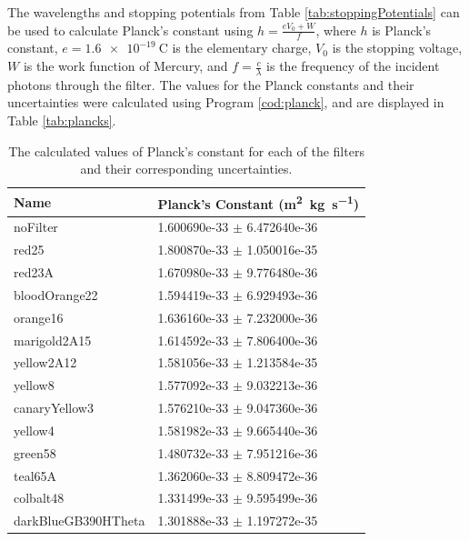 \documentclass[a4paper]{article}
\begin{document}
\qq The wavelengths and stopping potentials from Table
\ref{tab:stoppingPotentials} can be used to calculate Planck's constant using 
\( h = \frac{e V_0 + W}{f} \), where \( h \) is Planck's constant, \( e =
\SI{1.6e-19}{\coulomb} \) is the elementary charge, \( V_0 \) is the stopping
voltage, \( W \) is the work function of Mercury, and \( f = \frac{c}{\lambda}
\) is the frequency of the incident photons through the filter. The values for
the Planck constants and their uncertainties were calculated using Program
\ref{cod:planck}, and are displayed in Table \ref{tab:plancks}.

\begin{table}[H]
  \caption{The calculated values of Planck's constant for each of the filters
    and their corresponding uncertainties.}
  \begin{center}
    \begin{tabular}{|l|l|}
      \hline
      Name &                   Planck's Constant
             (\si{\square\meter\kilo\gram\per\second}) \\
      \hline
      noFilter &               1.600690e-33 \( \pm \) 6.472640e-36 \\
      red25 &                  1.800870e-33 \( \pm \) 1.050016e-35 \\
      red23A &                 1.670980e-33 \( \pm \) 9.776480e-36 \\
      bloodOrange22 &          1.594419e-33 \( \pm \) 6.929493e-36 \\
      orange16 &               1.636160e-33 \( \pm \) 7.232000e-36 \\
      marigold2A15 &           1.614592e-33 \( \pm \) 7.806400e-36 \\
      yellow2A12 &             1.581056e-33 \( \pm \) 1.213584e-35 \\
      yellow8 &                1.577092e-33 \( \pm \) 9.032213e-36 \\
      canaryYellow3 &          1.576210e-33 \( \pm \) 9.047360e-36 \\
      yellow4 &                1.581982e-33 \( \pm \) 9.665440e-36 \\
      green58 &                1.480732e-33 \( \pm \) 7.951216e-36 \\
      teal65A &                1.362060e-33 \( \pm \) 8.809472e-36 \\
      colbalt48 &              1.331499e-33 \( \pm \) 9.595499e-36 \\
      darkBlueGB390HTheta &    1.301888e-33 \( \pm \) 1.197272e-35 \\

\end{tabular}
\end{center}
\end{table}
\end{document}
